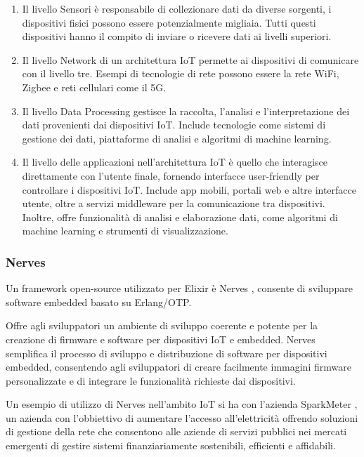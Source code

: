 \begin{enumerate}
	\item Il livello Sensori è responsabile di collezionare dati da
	diverse sorgenti, i dispositivi fisici possono essere potenzialmente
	migliaia. Tutti questi dispositivi hanno il compito di
	inviare o ricevere dati ai livelli superiori.
	\item Il livello Network di un architettura IoT permette ai
	dispositivi di comunicare con il livello tre.
	Esempi di tecnologie di rete possono essere la rete WiFi,
	Zigbee e reti cellulari come il 5G.
	\item Il livello Data Processing gestisce la
	raccolta, l'analisi e l'interpretazione dei dati
	provenienti dai dispositivi IoT.
	Include tecnologie come sistemi di gestione dei dati,
	piattaforme di analisi e algoritmi di machine learning.
	\item Il livello delle applicazioni nell'architettura
	IoT è quello che interagisce direttamente con 
	l'utente finale, fornendo interfacce user-friendly 
	per controllare i dispositivi IoT. 
	Include app mobili, portali web e altre interfacce utente,
	oltre a servizi middleware per la comunicazione tra dispositivi.
	Inoltre, offre funzionalità di analisi e elaborazione dati,
	come algoritmi di machine learning e strumenti di visualizzazione.
\end{enumerate}

\subsubsection{Nerves}

Un framework open-source utilizzato per Elixir
è Nerves \cite{NervesPr90:online}, consente di
sviluppare software embedded basato su Erlang/OTP.

Offre agli sviluppatori un ambiente di sviluppo 
coerente e potente per la creazione di firmware
e software per dispositivi IoT e embedded.
Nerves semplifica il processo di sviluppo e distribuzione
di software per dispositivi embedded,
consentendo agli sviluppatori di creare facilmente
immagini firmware personalizzate e di integrare le funzionalità
richieste dai dispositivi.

Un esempio di utilizzo di Nerves nell'ambito IoT si ha
con l'azienda SparkMeter \cite{SparkMet65:online},
un azienda con l'obbiettivo di aumentare l'accesso all'elettricità
offrendo soluzioni di gestione della rete che 
consentono alle aziende di servizi pubblici nei mercati emergenti
di gestire sistemi finanziariamente sostenibili,
efficienti e affidabili.

